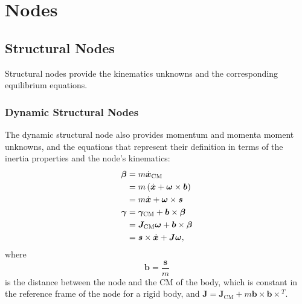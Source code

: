 \documentclass[10pt,fleqn,subeqn]{report}
\newcommand{\T}[1]{\bm{#1}}
\newcommand{\TT}[1]{\bm{#1}}
\begin{document}
\chapter{Nodes}
\label{sec:nodes}

\section{Structural Nodes}
\label{sec:nodes:structural nodes}
Structural nodes provide the kinematics unknowns
and the corresponding equilibrium equations.

\subsection{Dynamic Structural Nodes}
\label{sec:nodes:structural nodes:dynamic structural nodes}
The dynamic structural node also provides momentum and momenta moment
unknowns, and the equations that represent their definition
in terms of the inertia properties and the node's kinematics:
\begin{subequations}
\label{eq:body:momenta}
\begin{align}
	\T{\beta}
	&= m \dot{\T{x}}_{\text{CM}} \nonumber \\
	&= m \plbr{\dot{\T{x}} + \T{\omega}\times\T{b}} \nonumber \\
	&= m \dot{\T{x}} + \T{\omega} \times \T{s}
	\label{eq:body:momentum} \\
	\T{\gamma}
	&= \T{\gamma}_{\text{CM}} + \T{b} \times\T{\beta} \nonumber \\
	&= \TT{J}_{\text{CM}} \T{\omega} + \T{b} \times\T{\beta} \nonumber \\
	&= \T{s} \times \dot{\T{x}} + \TT{J} \T{\omega}
	\label{eq:body:momenta-moment} ,
\end{align}
\end{subequations}
where
\begin{equation}
	\T{b} = \frac{\T{s}}{m}
\end{equation}
is the distance between the node and the CM of the body,
which is constant in the reference frame of the node
for a rigid body,
and $\TT{J} = \TT{J}_\text{CM} + m \T{b}\times \T{b} \times{}^T$.
\end{document}
